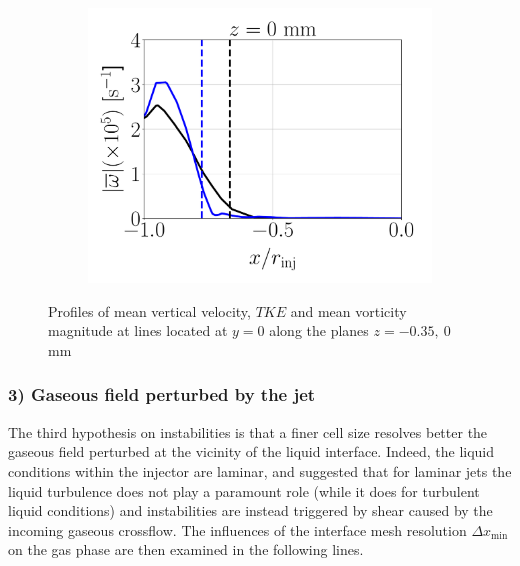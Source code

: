 \begin{figure}[ht]
\begin{subfigure}[b]{0.3\textwidth}
	\flushleft
   \includegraphics[scale=0.225]{./part2_developments/figures_ch5_resolved_JICF/instabilities_resolution/line_data_injector_vort_z0p00}
\end{subfigure}

   \vspace*{-0.15in}
   \caption{Profiles of mean vertical velocity, $TKE$ and mean vorticity magnitude at lines located at $y = 0$ along the planes $z = -0.35,~0$ mm}
\label{fig:jicf_data_lines_inside_injector}
\end{figure}

\clearpage

\subsubsection*{3) Gaseous field perturbed by the jet}



The third hypothesis on instabilities is that a finer cell size resolves better the gaseous field perturbed at the vicinity of the liquid interface. Indeed, the liquid conditions within the injector are laminar, and  suggested that for laminar jets the liquid turbulence does not play a paramount role (while it does for turbulent liquid conditions) and instabilities are instead triggered by shear caused by the incoming gaseous crossflow. The influences of the interface mesh resolution $\Delta x_\mathrm{min}$ on the gas phase are then examined in the following lines.



